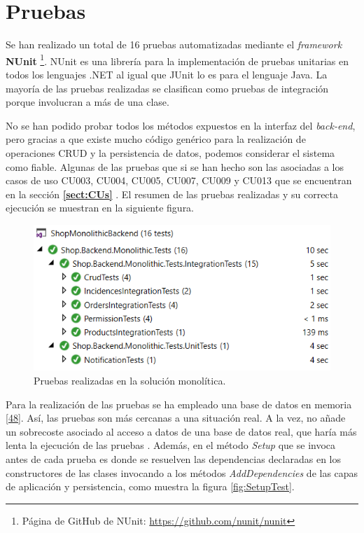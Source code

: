 \documentclass[11pt,spanish,listoffigures]{tfgetsinf}
\begin{document}
\section{Pruebas} \label{sect:MonoPruebas}

Se han realizado un total de 16 pruebas automatizadas mediante el \textit{framework} \textbf{NUnit} \footnote{ Página de GitHub de NUnit: \url{https://github.com/nunit/nunit}}. NUnit es una librería para la implementación de pruebas unitarias en todos los lenguajes .NET al igual que JUnit lo es para el lenguaje Java. La mayoría de las pruebas realizadas se clasifican como pruebas de integración porque involucran a más de una clase. 

No se han podido probar todos los métodos expuestos en la interfaz del \textit{back-end}, pero gracias a que existe mucho código genérico para la realización de operaciones CRUD y la persistencia de datos, podemos considerar el sistema como fiable. Algunas de las pruebas que si se han hecho son las asociadas a los casos de uso CU003, CU004, CU005, CU007, CU009 y CU013 que se encuentran en la sección \textbf{\ref{sect:CUs} }. El resumen de las pruebas realizadas y su correcta ejecución se muestran en la siguiente figura.

\begin{figure}[h]
\centering
\includegraphics[scale=0.8]{Tests}
\caption{Pruebas realizadas en la solución monolítica.}
\end{figure}

Para la realización de las pruebas se ha empleado una base de datos en memoria \hyperlink{page.80}{[48]}. Así, las pruebas son más cercanas a una situación real. A la vez, no añade un sobrecoste asociado al acceso a datos de una base de datos real, que haría más lenta la ejecución de las pruebas . Además, en el método \textit{Setup} que se invoca antes de cada prueba es donde se resuelven las dependencias declaradas en los constructores de las clases invocando a los métodos \textit{AddDependencies} de las capas de aplicación y persistencia, como muestra la figura \ref{fig:SetupTest}. 
\end{document}
